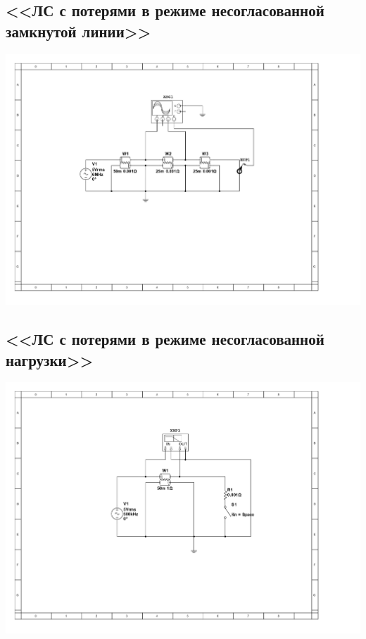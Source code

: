 \documentclass[11pt]{article}
\begin{document}
\subsection{<<ЛС с потерями в режиме несогласованной замкнутой линии>>}
\includegraphics[width=1\linewidth]{3/scheme.jpg}
\subsection{<<ЛС с потерями в режиме несогласованной нагрузки>>}
\includegraphics[width=1\linewidth]{4/scheme.jpg}
\end{document}
